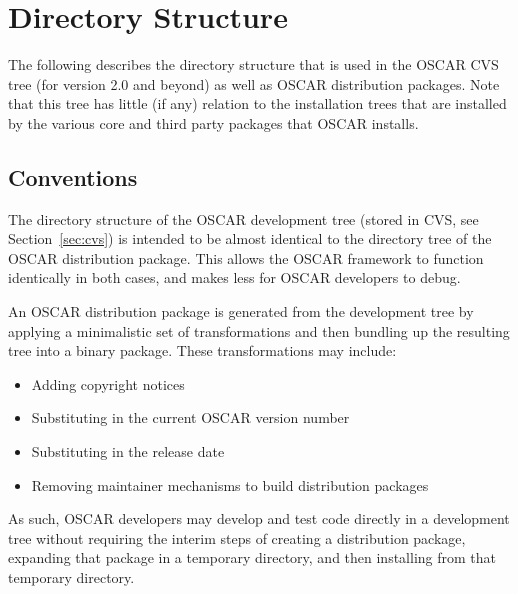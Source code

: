 %
%
%

\section{Directory Structure}
\label{sec:directory-structure}

The following describes the directory structure that is used in the
OSCAR CVS tree (for version 2.0 and beyond) as well as OSCAR
distribution packages.  Note that this tree has little (if any)
relation to the installation trees that are installed by the various
core and third party packages that OSCAR installs.


\subsection{Conventions}

The directory structure of the OSCAR development tree (stored in CVS,
see Section~\ref{sec:cvs}) is intended to be almost identical to the
directory tree of the OSCAR distribution package.  This allows the
OSCAR framework to function identically in both cases, and makes less
for OSCAR developers to debug.

An OSCAR distribution package is generated from the development tree
by applying a minimalistic set of transformations and then bundling up
the resulting tree into a binary package.  These transformations may
include:

\begin{itemize}
\item Adding copyright notices
\item Substituting in the current OSCAR version number
\item Substituting in the release date
\item Removing maintainer mechanisms to build distribution packages
\end{itemize}

As such, OSCAR developers may develop and test code directly in a
development tree without requiring the interim steps of creating a
distribution package, expanding that package in a temporary directory,
and then installing from that temporary directory.


